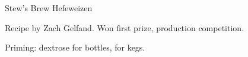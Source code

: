 \begin{recipe}{Stew's Brew Hefeweizen} %

\begin{aboutblock}
Recipe by Zach Gelfand. Won first prize, production competition.
\end{aboutblock}


\begin{methodandtiming}
 
\begin{mashsteps}
\end{mashsteps}

\begin{fermentationsteps}
\end{fermentationsteps}

\begin{directions}
Priming:  dextrose for bottles,  for kegs.
\end{directions}

\end{methodandtiming}

\recipebreak

\begin{ingredientsblock}

\begin{malts}
\end{malts}

\begin{hops}
\end{hops}


\end{ingredientsblock}

\end{recipe}

